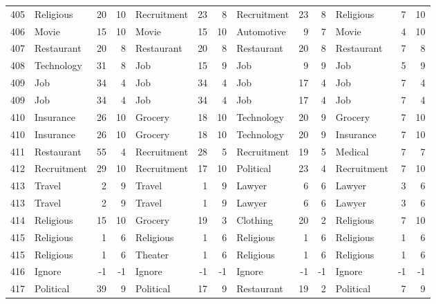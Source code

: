 \begin{figure}[htbp]
\begin{tabular}{rlrrlrrlrrlrr}
    405   & Religious & 20    & 10    & Recruitment & 23    & 8     & Recruitment & 23    & 8     & Religious & 7     & 10 \\
    406   & Movie & 15    & 10    & Movie & 15    & 10    & Automotive & 9     & 7     & Movie & 4     & 10 \\
    407   & Restaurant & 20    & 8     & Restaurant & 20    & 8     & Restaurant & 20    & 8     & Restaurant & 7     & 8 \\
    408   & Technology & 31    & 8     & Job   & 15    & 9     & Job   & 9     & 9     & Job   & 5     & 9 \\
    409   & Job   & 34    & 4     & Job   & 34    & 4     & Job   & 17    & 4     & Job   & 7     & 4 \\
    409   & Job   & 34    & 4     & Job   & 34    & 4     & Job   & 17    & 4     & Job   & 7     & 4 \\
    410   & Insurance & 26    & 10    & Grocery & 18    & 10    & Technology & 20    & 9     & Grocery & 7     & 10 \\
    410   & Insurance & 26    & 10    & Grocery & 18    & 10    & Technology & 20    & 9     & Insurance & 7     & 10 \\
    411   & Restaurant & 55    & 4     & Recruitment & 28    & 5     & Recruitment & 19    & 5     & Medical & 7     & 7 \\
    412   & Recruitment & 29    & 10    & Recruitment & 17    & 10    & Political & 23    & 4     & Recruitment & 7     & 10 \\
    413   & Travel & 2     & 9     & Travel & 1     & 9     & Lawyer & 6     & 6     & Lawyer & 3     & 6 \\
    413   & Travel & 2     & 9     & Travel & 1     & 9     & Lawyer & 6     & 6     & Lawyer & 3     & 6 \\
    414   & Religious & 15    & 10    & Grocery & 19    & 3     & Clothing & 20    & 2     & Religious & 7     & 10 \\
    415   & Religious & 1     & 6     & Religious & 1     & 6     & Religious & 1     & 6     & Religious & 1     & 6 \\
    415   & Religious & 1     & 6     & Theater & 1     & 6     & Religious & 1     & 6     & Religious & 1     & 6 \\
    416   & Ignore & -1    & -1    & Ignore & -1    & -1    & Ignore & -1    & -1    & Ignore & -1    & -1 \\
    417   & Political & 39    & 9     & Political & 17    & 9     & Restaurant & 19    & 2     & Political & 7     & 9 \\

\end{tabular}
\end{figure}

